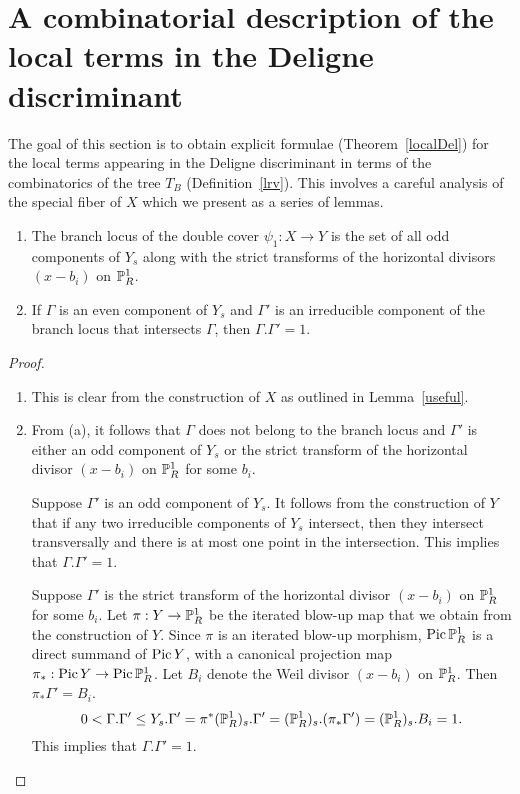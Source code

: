 \section{A combinatorial description of the local terms in the Deligne discriminant}\label{localcontribution}
The goal of this section is to obtain explicit formulae (Theorem~\ref{localDel}) for the local terms  appearing in the Deligne discriminant in terms of the combinatorics of the tree $T_B$ (Definition~\ref{lrv}). This involves a careful analysis of the special fiber of $X$ which we present as a series of lemmas.

\begin{lemma}\label{branchlocus} \hfill
\begin{enumerate}[\upshape (a)]
 \item The branch locus of the double cover $\psi_1: X \rightarrow Y$ is the set of all odd components of $Y_s$ along with the strict transforms of the horizontal divisors $(x-b_i)$ on $\P^1_R$. 
 \item If $\Gamma$ is an even component of $Y_s$ and $\Gamma'$ is an irreducible component of the branch locus that intersects $\Gamma$, then $\Gamma.\Gamma' = 1$.
\end{enumerate}
\end{lemma}
\begin{proof} \hfill
\begin{enumerate}[\upshape (a)]
 \item This is clear from the construction of $X$ as outlined in Lemma~\ref{useful}.
 \item From (a), it follows that $\Gamma$ does not belong to the branch locus and $\Gamma'$ is either an odd component of $Y_s$ or the strict transform of the horizontal divisor $(x-b_i)$ on $\P^1_R$ for some $b_i$. 
 
 Suppose $\Gamma'$ is an odd component of $Y_s$. It follows from the construction of $Y$ that if any two irreducible components of $Y_s$ intersect, then they intersect transversally and there is at most one point in the intersection. This implies that $\Gamma.\Gamma' = 1$. 
 
 Suppose $\Gamma'$ is the strict transform of the horizontal divisor $(x-b_i)$ on $\P^1_R$ for some $b_i$. Let $\pi: Y \rightarrow \P^1_R$ be the iterated blow-up map that we obtain from the construction of $Y$. Since $\pi$ is an iterated blow-up morphism,  $\Pic \P^1_R$ is a direct summand of $\Pic Y$, with a canonical projection map $\pi_* : \Pic Y \rightarrow \Pic \P^1_R$. Let $B_i$ denote the Weil divisor $(x-b_i)$ on $\P^1_R$. Then $\pi_* \Gamma' = B_i$.
 \[ 0 < \Gamma.\Gamma' \leq Y_s.\Gamma' = \pi^*(\P^1_R)_s.\Gamma' = (\P^1_R)_s.(\pi_* \Gamma') = (\P^1_R)_s.B_i = 1  . \]
 This implies that $\Gamma.\Gamma' = 1$. \qedhere
\end{enumerate}
\end{proof}

